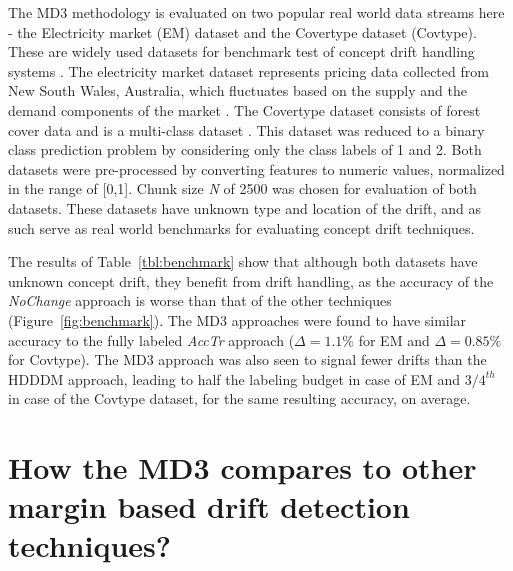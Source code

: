 \documentclass[authoryear,3p,times,twocolumn]{elsarticle}
\begin{document}
The MD3 methodology is evaluated on two popular real world data streams here - the Electricity market (EM) dataset and the Covertype dataset (Covtype).  These are widely used datasets for benchmark test of concept drift handling systems \citep{gama2004learning, goncalves2014comparative}. The electricity market dataset represents pricing data collected from New South Wales, Australia, which fluctuates based on the supply and the demand components of the market \cite{gama2004learning, goncalves2014comparative}. The Covertype dataset consists of forest cover data and is a multi-class dataset \cite{bifet2010fast}. This dataset was reduced to a binary class prediction problem by considering only the class labels of 1 and 2. Both datasets were pre-processed by converting features to numeric values, normalized in the range of [0,1]. Chunk size \textit{N} of 2500 was chosen for evaluation of both datasets. These datasets have unknown type and location of the drift, and as such serve as real world benchmarks for evaluating concept drift techniques. 

The results of Table~\ref{tbl:benchmark} show that although both datasets have unknown concept drift, they benefit from drift handling, as the accuracy of the \textit{NoChange} approach is worse than that of the other techniques (Figure~\ref{fig:benchmark}). The MD3 approaches were found to have similar accuracy to the fully labeled \textit{AccTr} approach ($\Delta=1.1\%$ for EM and $\Delta=0.85\%$ for Covtype). The MD3 approach was also seen to signal fewer drifts than the HDDDM approach, leading to half the labeling budget in case of EM and \textit{$3/4^{th}$} in case of the Covtype dataset, for the same resulting accuracy, on average. 

\section{How the MD3 compares to other margin based drift detection techniques?}
\label{sec:marginanalysis}
\end{document}
